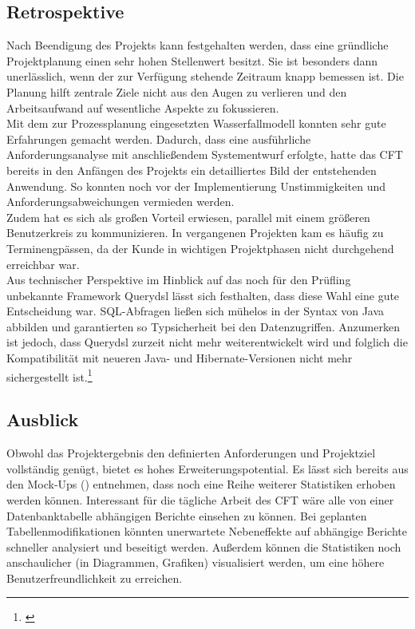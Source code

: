 \subsection{Retrospektive}\label{sec:Retrospektive}
Nach Beendigung des Projekts kann festgehalten werden, dass eine gründliche Projektplanung einen sehr hohen Stellenwert besitzt. Sie ist besonders dann unerlässlich, wenn der zur Verfügung stehende Zeitraum knapp bemessen ist. Die Planung hilft zentrale Ziele nicht aus den Augen zu verlieren und den Arbeitsaufwand auf wesentliche Aspekte zu fokussieren. \\
Mit dem zur Prozessplanung eingesetzten Wasserfallmodell konnten sehr gute Erfahrungen gemacht werden. Dadurch, dass eine ausführliche Anforderungsanalyse mit anschließendem Systementwurf erfolgte, hatte das \ac{CFT} \teamName bereits in den Anfängen des Projekts ein detailliertes Bild der entstehenden Anwendung. So konnten noch vor der Implementierung Unstimmigkeiten und Anforderungsabweichungen vermieden werden. \\
Zudem hat es sich als großen Vorteil erwiesen, parallel mit einem größeren Benutzerkreis zu kommunizieren. In vergangenen Projekten kam es häufig zu Terminengpässen, da der Kunde in wichtigen Projektphasen nicht durchgehend erreichbar war. \\
Aus technischer Perspektive im Hinblick auf das noch für den Prüfling unbekannte Framework Querydsl lässt sich festhalten, dass diese Wahl eine gute Entscheidung war. SQL-Abfragen ließen sich mühelos in der Syntax von Java abbilden und garantierten so Typsicherheit bei den Datenzugriffen. Anzumerken ist jedoch, dass Querydsl zurzeit nicht mehr weiterentwickelt wird und folglich die Kompatibilität mit neueren Java- und Hibernate-Versionen nicht mehr sichergestellt ist.\footnote{\cite{github:qdsl}}

\subsection{Ausblick}\label{sec:Ausblick}
Obwohl das Projektergebnis den definierten Anforderungen und Projektziel vollständig genügt, bietet es hohes Erweiterungspotential. Es lässt sich bereits aus den Mock-Ups () entnehmen, dass noch eine Reihe weiterer Statistiken erhoben werden können. Interessant für die tägliche Arbeit des \ac{CFT} \teamName wäre \zB alle von einer Datenbanktabelle abhängigen Berichte einsehen zu können. Bei geplanten Tabellenmodifikationen könnten unerwartete Nebeneffekte auf abhängige Berichte schneller analysiert und beseitigt werden.  Außerdem können die Statistiken noch anschaulicher (\zB in Diagrammen, Grafiken) visualisiert werden, um eine höhere Benutzerfreundlichkeit zu erreichen.